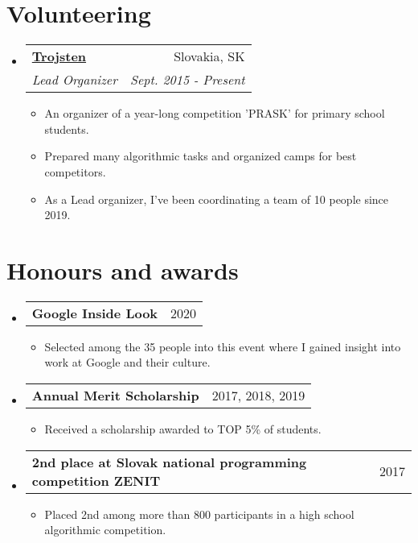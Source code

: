 \documentclass[letterpaper,11pt]{article}
\makeatletter
\newcommand{\resumeItem}[2]{
  \item\small{
    \textbf{#1}{#2 \vspace{-2pt}}
  }
}
\newcommand{\resumeSubheading}[4]{
  \vspace{-1pt}\item
    \begin{tabular*}{0.97\textwidth}{l@{\extracolsep{\fill}}r}
      \textbf{#1} & #2 \\
      \textit{\small#3} & \textit{\small #4} \\
    \end{tabular*}\vspace{-5pt}
}
\newcommand{\resumeSubheadingMY}[4]{
  \vspace{-1pt}\item
    \begin{tabular*}{0.97\textwidth}{l@{\extracolsep{\fill}}r}
      \textbf{#1} & #2 \\
    \end{tabular*}\vspace{-5pt}
}
\newcommand{\resumeSubHeadingListStart}{\begin{itemize}[leftmargin=*]}
\newcommand{\resumeSubHeadingListEnd}{\end{itemize}}
\newcommand{\resumeItemListStart}{\begin{itemize}}
\newcommand{\resumeItemListEnd}{\end{itemize}\vspace{-5pt}}
\makeatother
\begin{document}
\section{Volunteering}
  \resumeSubHeadingListStart
    \resumeSubheading
      {\href{https://www.trojsten.sk/}{Trojsten}}{Slovakia, SK}
      {Lead Organizer}{Sept. 2015 - Present}
      \resumeItemListStart
        \resumeItem{}
          {An organizer of a year-long competition 'PRASK' for primary school students.}
	\resumeItem{}
	  {Prepared many algorithmic tasks and organized camps for best competitors.}
        \resumeItem{}
          {As a Lead organizer, I've been coordinating a team of 10 people since 2019.}
      \resumeItemListEnd
  \resumeSubHeadingListEnd
  
 \section{Honours and awards}
  \resumeSubHeadingListStart
    \resumeSubheadingMY
      {Google Inside Look}{2020}
      {}{}
      \resumeItemListStart
        \resumeItem{}
          {Selected among the 35 people into this event where I gained insight into work at Google and their culture.}
      \resumeItemListEnd
    \resumeSubheadingMY
      {Annual Merit Scholarship}{2017, 2018, 2019}
      {}{}
      \resumeItemListStart
        \resumeItem{}
          {Received a scholarship awarded to TOP 5\% of students.}
      \resumeItemListEnd
     \resumeSubheadingMY
      {2nd place at Slovak national programming competition ZENIT}{2017}
      {}{}
      \resumeItemListStart
        \resumeItem{}
          {Placed 2nd among more than 800 participants in a high school algorithmic competition.}
      \resumeItemListEnd
      
  \resumeSubHeadingListEnd

\end{document}
